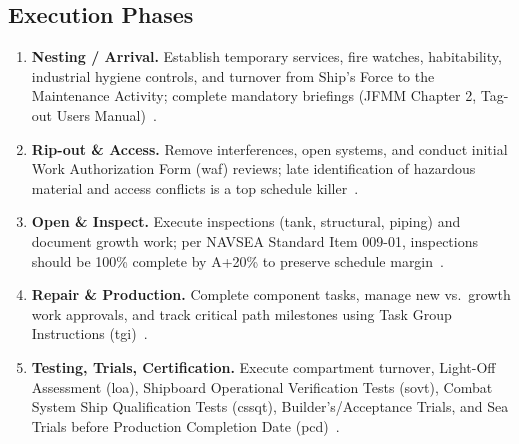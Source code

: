 \documentclass[../main.tex]{subfiles}
\begin{document}
\subsection{Execution Phases}
\begin{enumerate}
\item \textbf{Nesting / Arrival.} Establish temporary services, fire watches, habitability, industrial hygiene controls, and turnover from Ship's Force to the Maintenance Activity; complete mandatory briefings (JFMM Chapter 2, Tag-out Users Manual)~\autocite{edo-4-2-2-cno-availability-execution-2025}.
\item \textbf{Rip-out \& Access.} Remove interferences, open systems, and conduct initial Work Authorization Form (\ac{waf}) reviews; late identification of hazardous material and access conflicts is a top schedule killer~\autocite{COMFLTFORCOMINST4790-3}.
\item \textbf{Open \& Inspect.} Execute inspections (tank, structural, piping) and document growth work; per NAVSEA Standard Item 009-01, inspections should be 100\% complete by A+20\% to preserve schedule margin~\autocite{edo-4-2-2-cno-availability-execution-2025}.
\item \textbf{Repair \& Production.} Complete component tasks, manage new vs.\ growth work approvals, and track critical path milestones using Task Group Instructions (\ac{tgi})~\autocite{edo-4-2-2-cno-availability-execution-2025}.
\item \textbf{Testing, Trials, Certification.} Execute compartment turnover, Light-Off Assessment (\ac{loa}), Shipboard Operational Verification Tests (\ac{sovt}), Combat System Ship Qualification Tests (\ac{cssqt}), Builder's/Acceptance Trials, and Sea Trials before Production Completion Date (\ac{pcd})~\autocite{COMFLTFORCOMINST4790-3}.
\end{enumerate}
\end{document}
